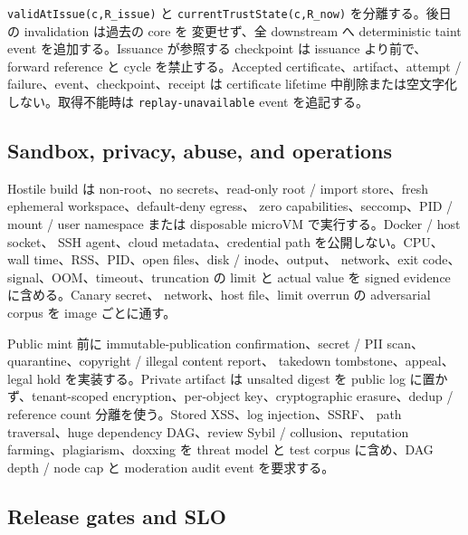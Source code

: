 \documentclass[a4paper,11pt]{ltjsarticle}
\newcommand{\code}[1]{\texttt{#1}}
\begin{document}
\code{validAtIssue(c,R\_issue)} と \code{currentTrustState(c,R\_now)} を分離する。後日の invalidation は過去の core を
変更せず、全 downstream へ deterministic taint event を追加する。Issuance が参照する checkpoint は issuance より前で、
forward reference と cycle を禁止する。Accepted certificate、artifact、attempt / failure、event、checkpoint、receipt は
certificate lifetime 中削除または空文字化しない。取得不能時は \code{replay-unavailable} event を追記する。

\subsection{Sandbox, privacy, abuse, and operations}

Hostile build は non-root、no secrets、read-only root / import store、fresh ephemeral workspace、default-deny egress、
zero capabilities、seccomp、PID / mount / user namespace または disposable microVM で実行する。Docker / host socket、
SSH agent、cloud metadata、credential path を公開しない。CPU、wall time、RSS、PID、open files、disk / inode、output、
network、exit code、signal、OOM、timeout、truncation の limit と actual value を signed evidence に含める。Canary secret、
network、host file、limit overrun の adversarial corpus を image ごとに通す。

Public mint 前に immutable-publication confirmation、secret / PII scan、quarantine、copyright / illegal content report、
takedown tombstone、appeal、legal hold を実装する。Private artifact は unsalted digest を public log に置かず、tenant-scoped
encryption、per-object key、cryptographic erasure、dedup / reference count 分離を使う。Stored XSS、log injection、SSRF、
path traversal、huge dependency DAG、review Sybil / collusion、reputation farming、plagiarism、doxxing を threat model と
test corpus に含め、DAG depth / node cap と moderation audit event を要求する。

\subsection{Release gates and SLO}
\end{document}
